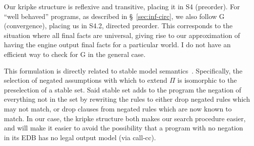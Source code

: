 Our kripke structure is reflexive and transitive, placing it in S4 (preorder).
For ``well behaved'' programs, as described in \S~\ref{sec:inf-circ}, we also follow G (convergence), placing us in S4.2, directed preorder.
This corresponds to the situation where all final facts are universal, giving rise to our approximation of having the engine output final facts for a particular world.
I do not have an efficient way to check for G in the general case.

This formulation is directly related to stable model semantics~\cite{stable-model}.
Specifically, the selection of negated assumptions with which to extend $\Pi$ is isomorphic to the preselection of a stable set.
Said stable set adds to the program the negation of everything not in the set by rewriting the rules to either drop negated rules which may not match, or drop clauses from negated rules which are now known to match.
In our case, the kripke structure both makes our search procedure easier, and will make it easier to avoid the possibility that a program with no negation in its EDB has no legal output model (via call-cc).

